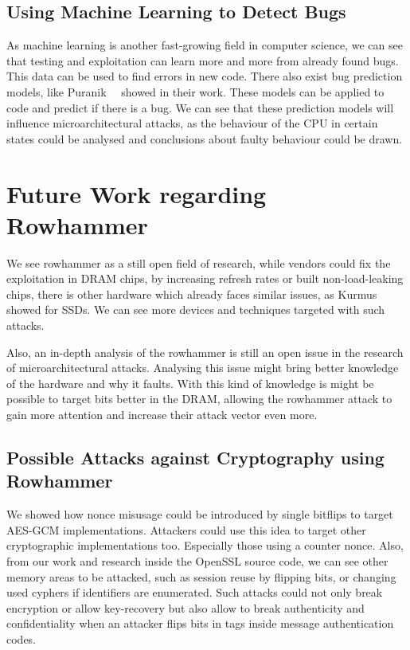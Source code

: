 \subsection{Using Machine Learning to Detect Bugs}

As machine learning is another fast-growing field in computer science, we can
see that testing and exploitation can learn more and more from already found
bugs. This data can be used to find errors in new code. There also exist bug
prediction models, like Puranik~\etal~\cite{bugprediction} showed in their work.
These models can be applied to code and predict if there is a bug. We can see
that these prediction models will influence microarchitectural attacks, as the
behaviour of the CPU in certain states could be analysed and conclusions about
faulty behaviour could be drawn.

\section{Future Work regarding Rowhammer}

We see rowhammer as a still open field of research, while vendors could fix the
exploitation in DRAM chips, by increasing refresh rates or built
non-load-leaking chips, there is other hardware which already faces similar
issues, as Kurmus~\etal~\cite{rowssdhammer} showed for SSDs. We can see more
devices and techniques targeted with such attacks.

Also, an in-depth analysis of the rowhammer is still an open issue in the
research of microarchitectural attacks. Analysing this issue might bring better
knowledge of the hardware and why it faults. With this kind of knowledge is
might be possible to target bits better in the DRAM, allowing the rowhammer
attack to gain more attention and increase their attack vector even more.

\subsection{Possible Attacks against Cryptography using Rowhammer}

We showed how nonce misusage could be introduced by single bitflips to target
AES-GCM implementations. Attackers could use this idea to target other
cryptographic implementations too. Especially those using a counter nonce. Also,
from our work and research inside the OpenSSL source code, we can see other
memory areas to be attacked, such as session reuse by flipping bits, or changing
used cyphers if identifiers are enumerated. Such attacks could not only break
encryption or allow key-recovery but also allow to break authenticity and
confidentiality when an attacker flips bits in tags inside message
authentication codes.

